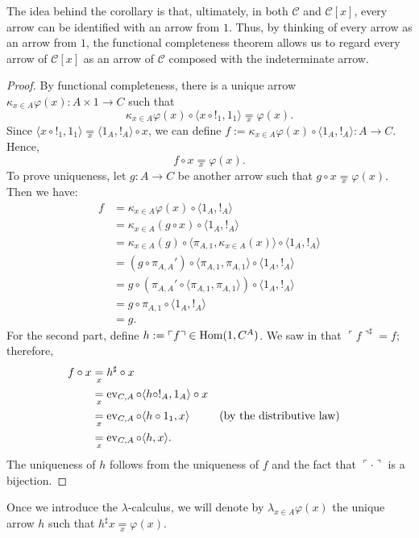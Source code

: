 The idea behind the corollary is that, ultimately, in both $\mathcal C$ and $\mathcal C[x]$, every arrow can be identified with an arrow from $1$.
Thus, by thinking of every arrow as an arrow from $1$, the functional completeness theorem allows us to regard every arrow of $\mathcal C[x]$ as an arrow of $\mathcal C$ composed with the indeterminate arrow.

\begin{proof}
    By functional completeness, there is a unique arrow $\kappa_{x \in A} \varphi(x) : A \times 1 \to C$ such that
    \[ \kappa_{x \in A} \varphi(x) \circ \langle x \circ !_1, 1_1\rangle \underset{x}{=} \varphi(x). \]
    Since $\langle x \circ !_1, 1_1\rangle \underset{x}{=} \langle 1_A, !_A \rangle \circ x$, we can define $f := \kappa_{x \in A} \varphi(x) \circ \langle 1_A, !_A \rangle : A \to C$. Hence,
    \[ f \circ x \underset{x}{=} \varphi(x). \]
    To prove uniqueness, let $g : A \to C$ be another arrow such that $g \circ x \underset{x}{=} \varphi(x)$. Then we have:
    \begin{align*}
        f &= \kappa_{x \in A}\varphi(x) \circ \langle 1_A,!_A\rangle \\
          &= \kappa_{x \in A}(g \circ x) \circ \langle 1_A,!_A\rangle \\
          &= \kappa_{x \in A}(g) \circ \langle \pi_{A,1},\kappa_{x \in A}(x)\rangle \circ \langle 1_A,!_A\rangle \\
          &= (g \circ \pi_{A,A}') \circ \langle \pi_{A,1},\pi_{A,1}\rangle \circ \langle 1_A,!_A\rangle \\
          &= g \circ (\pi_{A,A}' \circ \langle \pi_{A,1},\pi_{A,1}\rangle) \circ \langle 1_A,!_A\rangle \\
          &= g \circ \pi_{A,1} \circ \langle 1_A,!_A\rangle \\
          &= g.
    \end{align*}
    For the second part, define $h := \ulcorner f \urcorner \in \operatorname{Hom}(1,C^A)$. We saw in  that $\ulcorner f \urcorner^\sharp = f$; therefore,
    \begin{align*}
        f \circ x &\underset{x}{=} h^\sharp \circ x \\
                  &\underset{x}{=} \operatorname{ev}_{C,A} \circ \langle h \circ !_A,1_A \rangle \circ x \\
                  &\underset{x}{=} \operatorname{ev}_{C,A} \circ \langle h \circ 1_1, x \rangle &&(\textnormal{by the distributive law})\\
                  &\underset{x}{=} \operatorname{ev}_{C,A} \circ \langle h, x \rangle.
    \end{align*}
    The uniqueness of $h$ follows from the uniqueness of $f$ and the fact that $\ulcorner \cdot \urcorner$ is a bijection.
\end{proof}

\begin{remark}
    Once we introduce the $\lambda$-calculus, we will denote by $\lambda_{x \in A} \varphi(x)$ the unique arrow $h$ such that $h^\sharp x \underset{x}{=} \varphi(x)$.
\end{remark}
